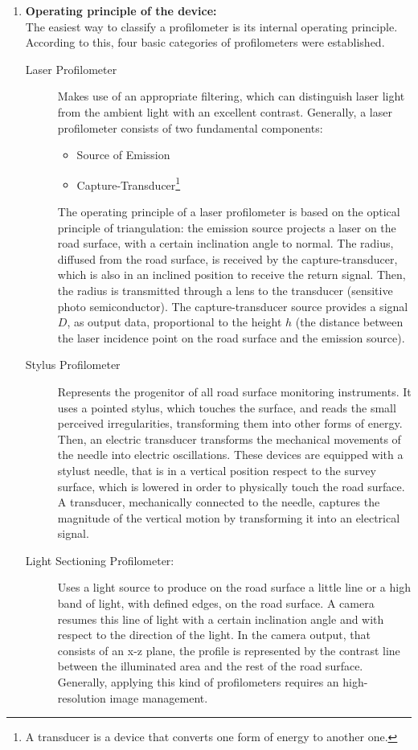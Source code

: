 \documentclass[tesi]{subfiles}
\begin{document}
\begin{enumerate}
\item \textbf{Operating principle of the device:}\\ The easiest way to classify a profilometer is its internal operating principle.
According to this, four basic categories of profilometers were established\cite{measuring_equipment}.

\begin{description}

\item [Laser Profilometer] Makes use of an appropriate filtering, which can distinguish laser light from the ambient light with an excellent contrast. Generally, a laser profilometer consists of two fundamental components:
\begin{itemize}
\item Source of Emission
\item Capture-Transducer\footnote{A transducer is a device that converts one form of energy to another one.}
\end{itemize}
The operating principle of a laser profilometer is based on the optical principle of triangulation: the emission source projects a laser on the road surface, with a certain inclination angle to normal. The radius, diffused from the road surface, is received by the capture-transducer, which is also in an inclined position to receive the return signal. Then, the radius is transmitted through a lens to the transducer\cite{arnberg1991laser} (sensitive photo semiconductor). The capture-transducer source provides a signal $D$, as output data, proportional to the height $h$ (the distance between the laser incidence point on the road surface and the emission source).
\item [Stylus Profilometer] Represents the progenitor of all road surface monitoring instruments. It uses a pointed stylus, which touches the surface, and reads the small perceived irregularities, transforming them into other forms of energy. Then, an electric transducer transforms the mechanical movements of the needle into electric oscillations. These devices are equipped with a stylust needle, that is in a vertical position respect to the survey surface, which is lowered in order to physically touch the road surface. A transducer, mechanically connected to the needle, captures the magnitude of the vertical motion by transforming it into an electrical signal.
\item [Light Sectioning Profilometer:] Uses a light source to produce on the road surface a little line or a high band of light, with defined edges, on the road surface. A camera resumes this line of light with a certain inclination angle and with respect to the direction of the light. In the camera output, that consists of an x-z plane, the profile is represented by the contrast line between the illuminated area and the rest of the road surface. Generally, applying this kind of profilometers requires an high-resolution image management.

\end{description}
\end{enumerate}
\end{document}
